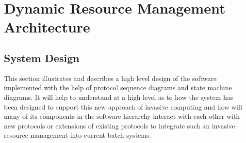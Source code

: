 \chapter{Dynamic Resource Management Architecture}\label{chapter:dynamic resource}

\section{System Design}

This section illustrates and describes a high level design of the software implemented with the help of protocol sequence diagrams and state machine diagrams. It will help to understand at a high level as to how the system has been designed to support this new approach of invasive computing and how will many of its components in the software hierarchy interact with each other with new protocols or extensions of existing protocols to integrate such an invasive resource management into current batch systems.\\


